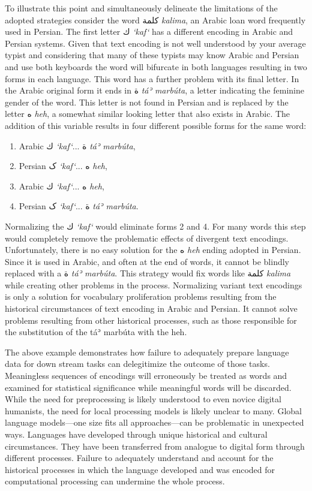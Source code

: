 \documentclass[12pt, oneside]{report}
\begin{document}
To illustrate this point and simultaneously delineate the limitations of the adopted strategies consider the word كلمة \textit{kalima}, an Arabic loan word frequently used in Persian.
The first letter ك \textit{`kaf`} has a different encoding in Arabic and Persian systems.
Given that text encoding is not well understood by your average typist and considering that many of these typists may know Arabic and Persian and use both keyboards the word will bifurcate in both languages resulting in two forms in each language.
This word has a further problem with its final letter.
In the Arabic original form it ends in ة \textit{t\'{a}ʾ marb\'{u}ta}, a letter indicating the feminine gender of the word.
This letter is not found in Persian and is replaced by the letter ه \textit{heh}, a somewhat similar looking letter that also exists in Arabic.
The addition of this variable results in four different possible forms for the same word:
\begin{enumerate}
	\item Arabic ك \textit{`kaf`}... ة \textit{t\'{a}ʾ marb\'{u}ta},
	\item Persian ک \textit{`kaf`}... ه \textit{heh},
	\item Arabic ك \textit{`kaf`}... ه \textit{heh},
	\item Persian ک \textit{`kaf`}... ة \textit{t\'{a}ʾ marb\'{u}ta}.
\end{enumerate}
Normalizing the ك \textit{`kaf`} would eliminate forms 2 and 4.
For many words this step would completely remove the problematic effects of divergent text encodings.
Unfortunately, there is no easy solution for the ه \textit{heh} ending adopted in Persian.
Since it is used in Arabic, and often at the end of words, it cannot be blindly replaced with a ة \textit{t\'{a}ʾ marb\'{u}ta}.
This strategy would fix words like كلمة \textit{kalima} while creating other problems in the process.
Normalizing variant text encodings is only a solution for vocabulary proliferation problems resulting from the historical circumstances of text encoding in Arabic and Persian.
It cannot solve problems resulting from other historical processes, such as those responsible for the substitution of the t\'{a}ʾ marb\'{u}ta with the heh.
\par
The above example demonstrates how failure to adequately prepare language data for down stream tasks can delegitimize the outcome of those tasks.
Meaningless sequences of encodings will erroneously be treated as words and examined for statistical significance while meaningful words will be discarded.
While the need for preprocessing is likely understood to even novice digital humanists, the need for local processing models is likely unclear to many.
Global language models---one size fits all approaches---can be problematic in unexpected ways.
Languages have developed through unique historical and cultural circumstances.
They have been transferred from analogue to digital form through different processes.
Failure to adequately understand and account for the historical processes in which the language developed and was encoded for computational processing can undermine the whole process.
\end{document}
